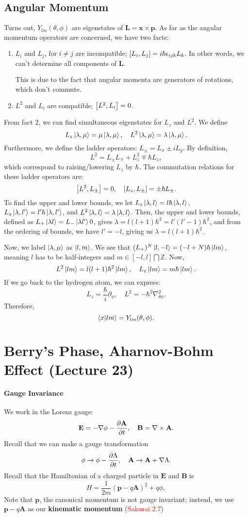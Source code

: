 \documentclass{article}
\begin{document}
\subsection{Angular Momentum}
Turns out, $Y_{lm}(\theta,\phi)$ are eigenstates of $\mathbf L=\mathbf x\times\mathbf p$. As far as the angular momentum operators are concerned, we have two facts:
\begin{enumerate}
    \item $L_i$ and $L_j$, for $i\ne j$ are incompatible; $\comm{L_i}{L_j}=i\hbar\epsilon_{ijk}L_k$. In other words, we can't determine all components of $\mathbf L$. 

    This is due to the fact that angular momenta are generators of rotations, which don't commute.
    \item $L^2$ and $L_i$ are compatible; $\comm{L^2}{L_i}=0$.
\end{enumerate}
From fact 2, we can find simultaneous eigenstates for $L_z$ and $L^2$. We define
$$L_z\ket{\lambda,\mu}=\mu\ket{\lambda,\mu},\quad L^2\ket{\lambda,\mu}=\lambda\ket{\lambda,\mu}.$$
Furthermore, we define the ladder operators: $L_\pm=L_x\pm iL_y$. By definition, 
$$L^2=L_\pm L_\mp +L_z^2\mp\hbar L_z,$$
which correspond to raising/lowering $L_z$ by $\hbar$.
The commutation relations for these ladder operators are:
$$\comm{L^2}{L_\pm}=0,\quad \comm{L_z}{L_\pm}=\pm\hbar L_\pm.$$
To find the upper and lower bounds, we let $L_z\ket{\lambda,l}=l\hbar\ket{\lambda,l},$ $L_z\ket{\lambda,l'}=l'\hbar\ket{\lambda,l'}$, and $L^2\ket{\lambda, l}=\lambda\ket{\lambda,l}$. Then, the upper and lower bounds, defined as $L_+\ket{\lambda l}=L_-\ket{\lambda l'}0$, gives $\lambda=l(l+1)\hbar^2=l'(l'-1)\hbar^2$, and from the ordering of bounds, we have $l'=-l$, giving us $\lambda=l(l+1)\hbar^2$.

Now, we label $\ket{\lambda,\mu}$ as $\ket{l,m}$. We see that $(L_+)^N\ket{l,-l}=(-l+N)\hbar\ket{lm}$, meaning $l$ has to be half-integers and $m\in[-l,l]\bigcap\mathbb Z.$ Now, 
$$L^2\ket{lm}=l(l+1)\hbar^2\ket{lm},\quad L_z\ket{lm}=m\hbar\ket{lm}.$$
If we go back to the hydrogen atom, we can express:
$$L_z=\frac\hbar i\partial_\phi,\quad L^2=-\hbar^2\nabla^2_{\theta\phi}.$$
Therefore, 
$$\braket{x}{lm}=Y_{lm}(\theta,\phi).$$

\section{Berry's Phase, Aharnov-Bohm Effect (Lecture 23)}
\paragraph{Gauge Invariance}
We work in the Lorenz gauge:
$$\mathbf E=-\nabla\phi- \frac{\partial \mathbf A}{\partial t},\quad\mathbf B=\nabla\times\mathbf A.$$
Recall that we can make a gauge transformation
$$\phi\to\phi- \frac{\partial \Lambda}{\partial t},\quad\mathbf A\to\mathbf A+\nabla\Lambda.$$
Recall that the Hamiltonian of a charged particle in $\mathbf E$ and $\mathbf B$ is 
$$H=\frac 1{2m}\left(\mathbf p-q\mathbf A\right)^2+q\phi,$$
Note that $\mathbf p$, the canonical momentum is not gauge invariant; instead, we use $\mathbf p-q\mathbf A$ as our \textbf{kinematic momentum} (\textcolor{red}{Sakurai 2.7})
\end{document}
